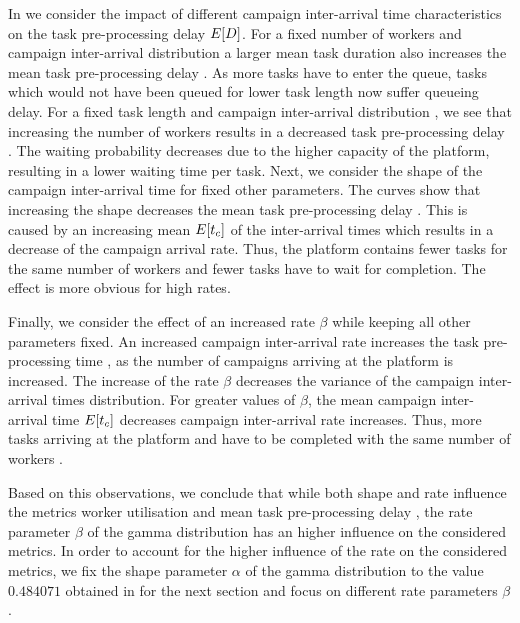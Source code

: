 In  we consider the impact of different campaign inter-arrival time characteristics \campaignIAT on the task pre-processing delay \(E[D]\).
For a fixed number of workers \numberOfWorkers and campaign inter-arrival distribution \campaignIAT a larger mean task duration \taskDuration also increases the mean task pre-processing delay \preTaskProcessingDelay. 
As more tasks have to enter the queue, tasks which would not have been queued for lower task length now suffer queueing delay.
For a fixed task length \taskDuration and campaign inter-arrival distribution \campaignIAT, we see that increasing the number of workers \numberOfWorkers results in a decreased task pre-processing delay \preTaskProcessingDelay.
The waiting probability decreases due to the higher capacity of the platform, resulting in a lower waiting time per task.
Next, we consider the shape of the campaign inter-arrival time for fixed other parameters. 
The curves show that increasing the shape decreases the mean task pre-processing delay \preTaskProcessingDelay. 
This is caused by an increasing mean \(E[t_c]\) of the inter-arrival times which results in a decrease of the campaign arrival rate.
Thus, the platform contains fewer tasks for the same number of workers \numberOfWorkers and fewer tasks have to wait for completion.
The effect is more obvious for high rates.

Finally, we consider the effect of an increased rate \(\beta\) while keeping all other parameters fixed.
An increased campaign inter-arrival rate increases the task pre-processing time \preTaskProcessingDelay, as the number of campaigns arriving at the platform is increased.
The increase of the rate \(\beta\) decreases the variance of the campaign inter-arrival times distribution.
For greater values of \(\beta\), the mean campaign inter-arrival time \(E[t_c]\) decreases campaign inter-arrival rate increases. 
Thus, more tasks arriving at the platform and have to be completed with the same number of workers \numberOfWorkers.

Based on this observations, we conclude that while both shape and rate influence the metrics worker utilisation \workerUtilization and mean task pre-processing delay  \preTaskProcessingDelay, the rate parameter \(\beta\) of the gamma distribution has an higher influence on the considered metrics.
In order to account for the higher influence of the rate on the considered metrics, we fix the shape parameter \(\alpha\) of the gamma distribution to the value \(0.484071\) obtained in  for the next section and focus on different rate parameters \(\beta\).

